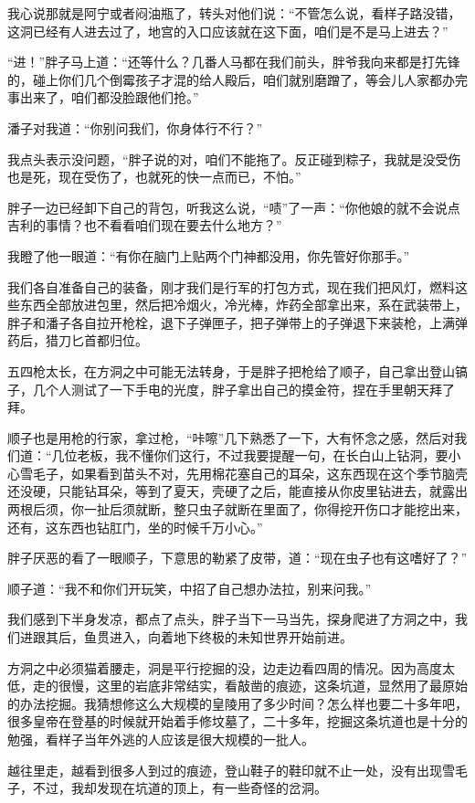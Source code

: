 我心说那就是阿宁或者闷油瓶了，转头对他们说：“不管怎么说，看样子路没错，这洞已经有人进去过了，地宫的入口应该就在这下面，咱们是不是马上进去？”

“进！”胖子马上道：“还等什么？几番人马都在我们前头，胖爷我向来都是打先锋的，碰上你们几个倒霉孩子才混的给人殿后，咱们就别磨蹭了，等会儿人家都办完事出来了，咱们都没脸跟他们抢。”

潘子对我道：“你别问我们，你身体行不行？”

我点头表示没问题，“胖子说的对，咱们不能拖了。反正碰到粽子，我就是没受伤也是死，现在受伤了，也就死的快一点而已，不怕。”

胖子一边已经卸下自己的背包，听我这么说，“啧”了一声：“你他娘的就不会说点吉利的事情？也不看看咱们现在要去什么地方？”

我瞪了他一眼道：“有你在脑门上贴两个门神都没用，你先管好你那手。”

我们各自准备自己的装备，刚才我们是行军的打包方式，现在我们把风灯，燃料这些东西全部放进包里，然后把冷烟火，冷光棒，炸药全部拿出来，系在武装带上，胖子和潘子各自拉开枪栓，退下子弹匣子，把子弹带上的子弹退下来装枪，上满弹药后，猎刀匕首都归位。

五四枪太长，在方洞之中可能无法转身，于是胖子把枪给了顺子，自己拿出登山镐子，几个人测试了一下手电的光度，胖子拿出自己的摸金符，捏在手里朝天拜了拜。

顺子也是用枪的行家，拿过枪，“咔嚓”几下熟悉了一下，大有怀念之感，然后对我们道：“几位老板，我不懂你们这行，不过我要提醒一句，在长白山上钻洞，要小心雪毛子，如果看到苗头不对，先用棉花塞自己的耳朵，这东西现在这个季节脑壳还没硬，只能钻耳朵，等到了夏天，壳硬了之后，能直接从你皮里钻进去，就露出两根后须，你一扯后须就断，整只虫子就断在里面了，你得挖开伤口才能挖出来，还有，这东西也钻肛门，坐的时候千万小心。”

胖子厌恶的看了一眼顺子，下意思的勒紧了皮带，道：“现在虫子也有这嗜好了？”

顺子道：“我不和你们开玩笑，中招了自己想办法拉，别来问我。”

我们感到下半身发凉，都点了点头，胖子当下一马当先，探身爬进了方洞之中，我们进跟其后，鱼贯进入，向着地下终极的未知世界开始前进。

方洞之中必须猫着腰走，洞是平行挖掘的没，边走边看四周的情况。因为高度太低，走的很慢，这里的岩底非常结实，看敲凿的痕迹，这条坑道，显然用了最原始的办法挖掘。我猜想修这么大规模的皇陵用了多少时间？怎么样也要二十多年吧，很多皇帝在登基的时候就开始着手修坟墓了，二十多年，挖掘这条坑道也是十分的勉强，看样子当年外逃的人应该是很大规模的一批人。

越往里走，越看到很多人到过的痕迹，登山鞋子的鞋印就不止一处，没有出现雪毛子，不过，我却发现在坑道的顶上，有一些奇怪的岔洞。

